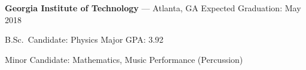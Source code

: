 
\textbf{Georgia Institute of Technology} --- Atlanta, GA
\hfill
Expected Graduation: May 2018

B.Sc.\ Candidate: Physics
\hfill
Major GPA: 3.92

Minor Candidate: Mathematics, Music Performance (Percussion)

